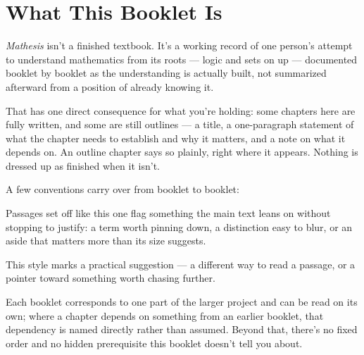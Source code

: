 \chapter*{What This Booklet Is}

\textit{Mathesis} isn't a finished textbook. It's a working record of one
person's attempt to understand mathematics from its roots --- logic and
sets on up --- documented booklet by booklet as the understanding is
actually built, not summarized afterward from a position of already
knowing it.

That has one direct consequence for what you're holding: some chapters
here are fully written, and some are still outlines --- a title, a
one-paragraph statement of what the chapter needs to establish and why
it matters, and a note on what it depends on. An outline chapter says so
plainly, right where it appears. Nothing is dressed up as finished when
it isn't.

A few conventions carry over from booklet to booklet:

\begin{notebox}
Passages set off like this one flag something the main text leans on
without stopping to justify: a term worth pinning down, a distinction
easy to blur, or an aside that matters more than its size suggests.
\end{notebox}

\begin{tipbox}
This style marks a practical suggestion --- a different way to read a
passage, or a pointer toward something worth chasing further.
\end{tipbox}

Each booklet corresponds to one part of the larger project and can be
read on its own; where a chapter depends on something from an earlier
booklet, that dependency is named directly rather than assumed. Beyond
that, there's no fixed order and no hidden prerequisite this booklet
doesn't tell you about.
